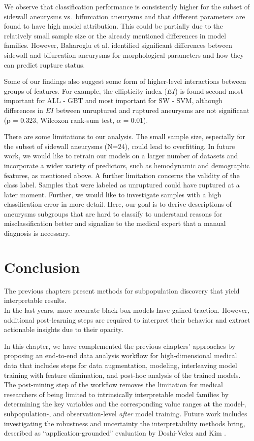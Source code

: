\documentclass[
  oneside]{book}
\begin{document}
We observe that classification performance is consistently higher for the subset of sidewall aneurysms vs.~bifurcation aneurysms and that different parameters are found to have high model attribution.
This could be partially due to the relatively small sample size or the already mentioned differences in model families.
However, Baharoglu et al. \autocite{BaharogluEtAl:Neurosurgery2012} identified significant differences between sidewall and bifurcation aneurysms for morphological parameters and how they can predict rupture status.

Some of our findings also suggest some form of higher-level interactions between groups of features.
For example, the ellipticity index (\(EI\)) is found second most important for ALL - GBT and most important for SW - SVM, although differences in \(EI\) between unruptured and ruptured aneurysms are not significant (p = 0.323, Wilcoxon rank-sum test, \(\alpha\) = 0.01).

There are some limitations to our analysis.
The small sample size, especially for the subset of sidewall aneurysms (N=24), could lead to overfitting.
In future work, we would like to retrain our models on a larger number of datasets and incorporate a wider variety of predictors, such as hemodynamic and demographic features, as mentioned above.
A further limitation concerns the validity of the class label.
Samples that were labeled as unruptured could have ruptured at a later moment.
Further, we would like to investigate samples with a high classification error in more detail.
Here, our goal is to derive descriptions of aneurysms subgroups that are hard to classify to understand reasons for misclassification better and signalize to the medical expert that a manual diagnosis is necessary.

\hypertarget{iml-conclusion}{%
\section{Conclusion}\label{iml-conclusion}}

The previous chapters present methods for subpopulation discovery that yield interpretable results.\\
In the last years, more accurate black-box models have gained traction.
However, additional post-learning steps are required to interpret their behavior and extract actionable insights due to their opacity.

In this chapter, we have complemented the previous chapters' approaches by proposing an end-to-end data analysis workflow for high-dimensional medical data that includes steps for data augmentation, modeling, interleaving model training with feature elimination, and post-hoc analysis of the trained models.
The post-mining step of the workflow removes the limitation for medical researchers of being limited to intrinsically interpretable model families by determining the key variables and the corresponding value ranges at the model-, subpopulation-, and observation-level \emph{after} model training.
Future work includes investigating the robustness and uncertainty the interpretability methods bring, described as ``application-grounded'' evaluation by Doshi-Velez and Kim \autocite{Doshi-Velez:arxiv2017}.
\end{document}
